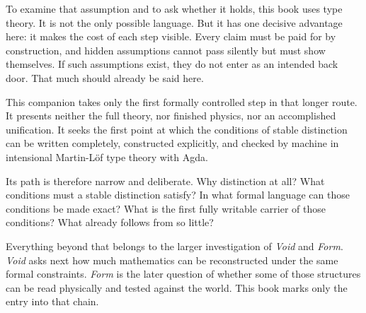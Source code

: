 \documentclass[11pt,a4paper]{book}
\begin{document}
To examine that assumption and to ask whether it holds, this book uses type
theory. It is not the only possible language. But it has one decisive
advantage here: it makes the cost of each step visible. Every claim must be
paid for by construction, and hidden assumptions cannot pass silently but
must show themselves. If such assumptions exist, they do not enter as an
intended back door. That much should already be said here.

This companion takes only the first formally controlled step in that longer
route. It presents neither the full theory, nor finished physics, nor an
accomplished unification. It seeks the first point at which the conditions
of stable distinction can be written completely, constructed explicitly, and
checked by machine in intensional Martin-L\"of type theory with Agda.

Its path is therefore narrow and deliberate. Why distinction at all? What
conditions must a stable distinction satisfy? In what formal language can
those conditions be made exact? What is the first fully writable carrier of
those conditions? What already follows from so little?

Everything beyond that belongs to the larger investigation of \textit{Void}
and \textit{Form}. \textit{Void} asks next how much mathematics can be
reconstructed under the same formal constraints. \textit{Form} is the later
question of whether some of those structures can be read physically and
tested against the world. This book marks only the entry into that chain.

\tableofcontents

\mainmatter


\begin{code}[hide]%
\>[0]\AgdaSymbol{\{-\#}\AgdaSpace{}%
\AgdaSpace{}%
\AgdaSpace{}%
\AgdaSpace{}%
\AgdaSymbol{\#-\}}\<%
\\
%
\\[\AgdaEmptyExtraSkip]%
\>[0]\AgdaSpace{}%
\AgdaSpace{}%
\<%
\end{code}
\end{document}

